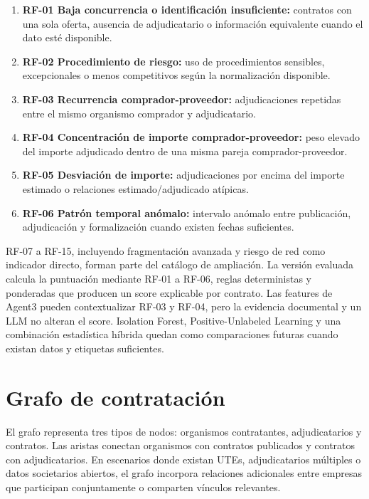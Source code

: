 \documentclass[11pt,a4paper,spanish]{book}
\numberwithin{equation}{chapter}
\numberwithin{figure}{chapter}
\begin{document}
\begin{enumerate}
  \item \textbf{RF-01 Baja concurrencia o identificaci{\'o}n insuficiente:} contratos con una sola oferta, ausencia de adjudicatario o informaci{\'o}n equivalente cuando el dato est{\'e} disponible.
  \item \textbf{RF-02 Procedimiento de riesgo:} uso de procedimientos sensibles, excepcionales o menos competitivos seg{\'u}n la normalizaci{\'o}n disponible.
  \item \textbf{RF-03 Recurrencia comprador-proveedor:} adjudicaciones repetidas entre el mismo organismo comprador y adjudicatario.
  \item \textbf{RF-04 Concentraci{\'o}n de importe comprador-proveedor:} peso elevado del importe adjudicado dentro de una misma pareja comprador-proveedor.
  \item \textbf{RF-05 Desviaci{\'o}n de importe:} adjudicaciones por encima del importe estimado o relaciones estimado/adjudicado at{\'i}picas.
  \item \textbf{RF-06 Patr{\'o}n temporal an{\'o}malo:} intervalo an{\'o}malo entre publicaci{\'o}n, adjudicaci{\'o}n y formalizaci{\'o}n cuando existen fechas suficientes.
\end{enumerate}

RF-07 a RF-15, incluyendo fragmentaci{\'o}n avanzada y riesgo de red como indicador directo, forman parte del cat{\'a}logo de ampliaci{\'o}n. La versi{\'o}n evaluada calcula la puntuaci{\'o}n mediante RF-01 a RF-06, reglas deterministas y ponderadas que producen un score explicable por contrato. Las features de Agent3 pueden contextualizar RF-03 y RF-04, pero la evidencia documental y un LLM no alteran el score. Isolation Forest, Positive-Unlabeled Learning y una combinaci{\'o}n estad{\'i}stica h{\'i}brida quedan como comparaciones futuras cuando existan datos y etiquetas suficientes.

\section{Grafo de contrataci{\'o}n}
\label{sec:grafo_contratacion_cap6}

El grafo representa tres tipos de nodos: organismos contratantes, adjudicatarios y contratos. Las aristas conectan organismos con contratos publicados y contratos con adjudicatarios. En escenarios donde existan UTEs, adjudicatarios m{\'u}ltiples o datos societarios abiertos, el grafo incorpora relaciones adicionales entre empresas que participan conjuntamente o comparten v{\'i}nculos relevantes.
\end{document}
